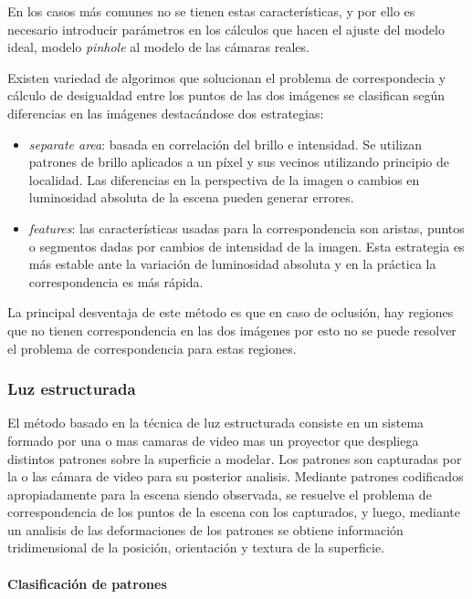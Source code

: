 En los casos más comunes no se tienen estas características, y por ello es necesario introducir parámetros en los cálculos que hacen el ajuste del modelo ideal, modelo \emph{pinhole} al modelo de las cámaras reales. 

Existen variedad de algorimos que solucionan el problema de correspondecia y cálculo de desigualdad entre los puntos de las dos imágenes se clasifican según diferencias en las imágenes destacándose dos estrategias:
\begin{itemize}
   \item \emph{separate area}: basada en correlación del brillo e intensidad. Se utilizan patrones de brillo aplicados a un píxel y sus vecinos utilizando principio de localidad. Las diferencias en la perspectiva de la imagen o cambios en luminosidad absoluta de la escena pueden generar errores.
   \item \emph{features}: las características usadas para la correspondencia son aristas, puntos o segmentos dadas por cambios de intensidad de la imagen. Esta estrategia es más estable ante la variación de luminosidad absoluta y en la práctica la correspondencia es más rápida.
\end{itemize}
La principal desventaja de este método es que en caso de oclusión, hay regiones que no tienen correspondencia en las dos imágenes por esto no se puede resolver el problema de correspondencia para estas regiones.

\subsubsection{Luz estructurada}

El método basado en la técnica de luz estructurada consiste en un sistema formado por una o mas camaras de video mas un proyector que despliega distintos patrones sobre la superficie a modelar. Los patrones son capturadas por la o las cámara de video para su posterior analisis. Mediante patrones codificados apropiadamente para la escena siendo observada, se resuelve el problema de correspondencia de los puntos de la escena con los capturados, y luego, mediante un analisis de las deformaciones de los patrones se obtiene información tridimensional de la posición, orientación y textura de la superficie\cite{SLightPatterns}.

\paragraph{Clasificación de patrones}

